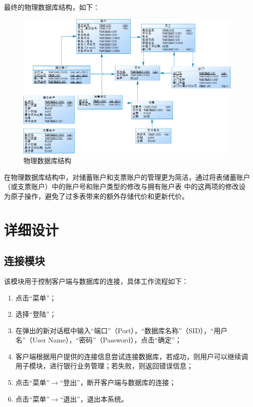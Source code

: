 \documentclass{ctexart}
\begin{document}
最终的物理数据库结构，如下：
\begin{figure}[H]
    \centering
    \includegraphics[scale=0.6]{phy.png}
    \caption{物理数据库结构}
\end{figure}
在物理数据库结构中，对储蓄账户和支票账户的管理更为简洁，通过将表储蓄账户（或支票账户）中的账户号和账户类型的修改与拥有账户表
中的这两项的修改设为原子操作，避免了过多表带来的额外存储代价和更新代价。
\section{\hei 详细设计}
\subsection{\hei 连接模块}
该模块用于控制客户端与数据库的连接，具体工作流程如下：
\begin{enumerate}
    \item 点击“菜单”；
    \item 选择“登陆”；
    \item 在弹出的新对话框中输入“端口”（Port），“数据库名称”（SID），“用户名”（User Name），“密码”（Password），点击“确定”；
    \item 客户端根据用户提供的连接信息尝试连接数据库，若成功，则用户可以继续调用子模块，进行银行业务管理；若失败，则返回错误信息；
    \item 点击“菜单”$\rightarrow$“登出”，断开客户端与数据库的连接；
    \item 点击“菜单”$\rightarrow$“退出”，退出本系统。
\end{enumerate}
\end{document}
